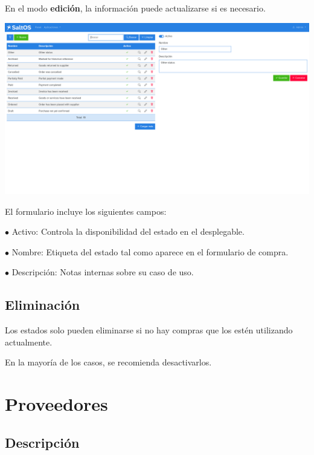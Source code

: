 \documentclass[a4paper]{article}
\begin{document}
En el modo \textbf{edición}, la información puede actualizarse si es necesario.

\begin{center}\includegraphics[width=1\textwidth]{../ujest/snaps/test-screenshots-js-screenshots-purchases-purchase-status-edit-10-es-es-1-snap.png}\end{center}

El formulario incluye los siguientes campos:

\begin{compactitem}
\item[\color{myblue}$\bullet$] Activo: Controla la disponibilidad del estado en el desplegable.
\item[\color{myblue}$\bullet$] Nombre: Etiqueta del estado tal como aparece en el formulario de compra.
\item[\color{myblue}$\bullet$] Descripción: Notas internas sobre su caso de uso.
\end{compactitem}

\hypertarget{toc125}{}
\subsection{Eliminación}

Los estados solo pueden eliminarse si no hay compras que los estén utilizando actualmente.

En la mayoría de los casos, se recomienda desactivarlos.


\hypertarget{toc126}{}
\section{Proveedores}

\hypertarget{toc127}{}
\subsection{Descripción}
\end{document}
